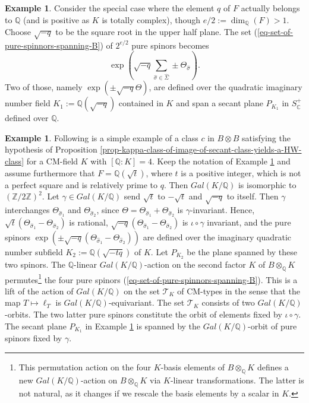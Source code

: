 \documentclass[12pt]{amsart}
\numberwithin{equation}{subsection}
\theoremstyle{plain}
\theoremstyle{definition}
\newtheorem{example}[thm]{Example}
\newcommand{\CC}{{\mathbb C}}
\newcommand{\QQ}{{\mathbb Q}}
\newcommand{\T}{{\mathcal T}}
\newcommand{\ZZ}{{\mathbb Z}}
\begin{document}
{\begin{example}
\label{example-K-is-extention-of-F-by-sqrt-of-a-negative-rational-number}
Consider the special case where the element $q$ of $F$ actually belongs to $\QQ$ (and is positive as $K$ is totally complex), though $e/2:=\dim_\QQ(F)>1$. 
Choose $\sqrt{-q}$ to be the square root in the upper half plane. 
The set (\ref{eq-set-of-pure-spinnors-spanning-B}) of $2^{e/2}$ pure spinors becomes
\[
\exp\left(\sqrt{-q}\sum_{\hat{\sigma}\in \hat{\Sigma}}\pm\Theta_{\hat{\sigma}}\right).
\]
Two of those, namely $\exp\left(\pm\sqrt{-q}\Theta\right)$, are defined over the quadratic imaginary number field $K_1:=\QQ(\sqrt{-q})$ contained in $K$ and 
span a secant plane $P_{K_1}$ in $S^+_\CC$ defined over $\QQ$.
\end{example}

\begin{example}
Following is a simple example of a class $c$ in $B\otimes B$ satisfying the hypothesis of Proposition \ref{prop-kappa-class-of-image-of-secant-class-yields-a-HW-class} for a CM-field $K$ with $[\QQ:K]=4$.
Keep the notation of Example \ref{example-K-is-extention-of-F-by-sqrt-of-a-negative-rational-number} and assume furthermore that $F=\QQ(\sqrt{t})$, where $t$ is a positive integer, which is not a perfect square and is relatively prime to $q$. Then $Gal(K/\QQ)$ is isomorphic to $(\ZZ/2\ZZ)^2$. Let $\gamma\in Gal(K/\QQ)$ send $\sqrt{t}$ to $-\sqrt{t}$ and
$\sqrt{-q}$ to itself. Then $\gamma$ interchanges $\Theta_{\hat{\sigma}_1}$ and $\Theta_{\hat{\sigma}_2}$, since $\Theta=\Theta_{\hat{\sigma}_1}+\Theta_{\hat{\sigma}_2}$ is $\gamma$-invariant. Hence,
$\sqrt{t}(\Theta_{\hat{\sigma}_1}-\Theta_{\hat{\sigma}_2})$ is rational, 
$\sqrt{-q}(\Theta_{\hat{\sigma}_1}-\Theta_{\hat{\sigma}_2})$ is $\iota\circ\gamma$ invariant, and the pure spinors 
$\exp(\pm \sqrt{-q}(\Theta_{\hat{\sigma}_1}-\Theta_{\hat{\sigma}_2}))$ are defined over the imaginary quadratic number subfield $K_2:=\QQ(\sqrt{-tq})$ of $K$.
Let $P_{K_2}$ be the plane spanned by these two spinors.
The $\QQ$-linear  $Gal(K/\QQ)$-action on the second factor $K$ of $B\otimes_\QQ K$ permutes\footnote{This permutation action on 
the four $K$-basis elements of $B\otimes_\QQ K$
defines 
a new $Gal(K/\QQ)$-action on $B\otimes_\QQ K$ via $K$-linear transformations. The latter is not natural, as it changes if we rescale the basis elements by a scalar in $K$.
} 
the four pure spinors (\ref{eq-set-of-pure-spinnors-spanning-B}). 
This is a lift of the action of $Gal(K/\QQ)$ on the set $\T_K$ of CM-types in the sense that the map $T\mapsto \ell_T$ is $Gal(K/\QQ)$-equivariant.
The set $\T_K$ consists of two $Gal(K/\QQ)$-orbits.
The two latter pure spinors constitute the orbit of elements fixed by $\iota\circ\gamma$. 
The secant plane $P_{K_1}$ in Example \ref{example-K-is-extention-of-F-by-sqrt-of-a-negative-rational-number} is 
spanned by the $Gal(K/\QQ)$-orbit of pure spinors fixed by $\gamma$. 


\end{example}}
\end{document}
